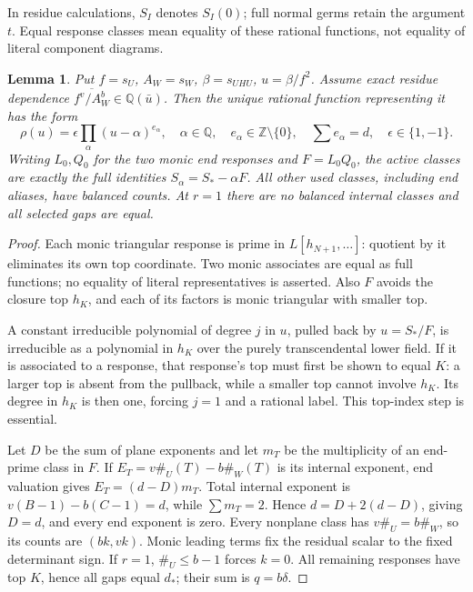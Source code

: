 \documentclass[11pt,a4paper]{amsart}
\numberwithin{equation}{section}
\theoremstyle{plain}
\newtheorem{lemma}[theorem]{Lemma}
\theoremstyle{definition}
\begin{document}
In residue calculations, \(S_I\) denotes \(S_I(0)\); full normal germs retain the argument \(t\).  Equal response classes mean equality of these rational functions, not equality of literal component diagrams.

\begin{lemma}\label{lem:residue-classifier}
Put \(f=s_U\), \(A_W=s_W\), \(\beta=s_{UHU}\), \(u=\beta/f^2\).  Assume exact residue dependence \(\overline{f^v/A_W^b}\in\mathbb Q(\bar u)\).  Then the unique rational function representing it has the form
\[
 \rho(u)=\epsilon\prod_\alpha(u-\alpha)^{e_\alpha},
 \quad\alpha\in\mathbb Q,\quad e_\alpha\in\mathbb Z\setminus\{0\},
 \quad\sum e_\alpha=d,\quad\epsilon\in\{1,-1\}.
\]
Writing \(L_0,Q_0\) for the two monic end responses and \(F=L_0Q_0\), the active classes are exactly the full identities \(S_\alpha=S_*-\alpha F\).  All other used classes, including end aliases, have balanced counts.  At \(r=1\) there are no balanced internal classes and all selected gaps are equal.
\end{lemma}
\begin{proof}
Each monic triangular response is prime in \(L[h_{N+1},\ldots]\): quotient by it eliminates its own top coordinate.  Two monic associates are equal as full functions; no equality of literal representatives is asserted.  Also \(F\) avoids the closure top \(h_K\), and each of its factors is monic triangular with smaller top.

A constant irreducible polynomial of degree \(j\) in \(u\), pulled back by \(u=S_*/F\), is irreducible as a polynomial in \(h_K\) over the purely transcendental lower field.  If it is associated to a response, that response's top must first be shown to equal \(K\): a larger top is absent from the pullback, while a smaller top cannot involve \(h_K\).  Its degree in \(h_K\) is then one, forcing \(j=1\) and a rational label.  This top-index step is essential.

Let \(D\) be the sum of plane exponents and let \(m_T\) be the multiplicity of an end-prime class in \(F\).  If \(E_T=v\#_U(T)-b\#_W(T)\) is its internal exponent, end valuation gives \(E_T=(d-D)m_T\).  Total internal exponent is \(v(B-1)-b(C-1)=d\), while \(\sum m_T=2\).  Hence \(d=D+2(d-D)\), giving \(D=d\), and every end exponent is zero.  Every nonplane class has \(v\#_U=b\#_W\), so its counts are \((bk,vk)\).  Monic leading terms fix the residual scalar to the fixed determinant sign.  If \(r=1\), \(\#_U\le b-1\) forces \(k=0\).  All remaining responses have top \(K\), hence all gaps equal \(d_*\); their sum is \(q=b\delta\).
\end{proof}
\end{document}
